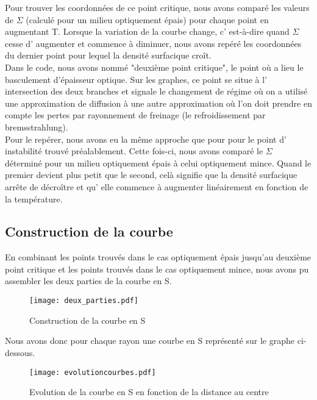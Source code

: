 Pour trouver les coordonnées de ce point critique, nous avons comparé les valeurs de $\Sigma$ (calculé pour un milieu optiquement épais) pour chaque point en augmentant T. Lorsque la variation de la courbe change, c' est-à-dire quand $\Sigma$ cesse d' augmenter et commence à diminuer, nous avons repéré les coordonnées du dernier point pour lequel la densité surfacique croît.  
\\
Dans le code, nous avons nommé "deuxième point critique", le point où a lieu le basculement d'épaisseur optique. Sur les graphes, ce point se situe à l' intersection des deux branches et signale le changement de régime où on a utilisé une approximation de diffusion à une autre approximation où l'on doit prendre en compte les pertes par rayonnement de freinage (le refroidissement par bremsstrahlung).
\\
Pour le repérer, nous avons eu la même approche que pour pour le point d' instabilité trouvé préalablement. Cette fois-ci, nous avons comparé le $\Sigma$ déterminé pour un milieu optiquement épais à celui optiquement mince. Quand le premier devient plus petit que le second, celà signifie que la densité surfacique arrête de décroître et qu' elle commence à augmenter linéairement en fonction de la température. 
\\

\subsection{Construction de la courbe}

En combinant les points trouvés dans le cas optiquement épais jusqu'au deuxième point critique et les points trouvés dans le cas optiquement mince, nous avons pu assembler les deux parties de la courbe en S.

\begin{figure}[htb!]
	\centering
	\texttt{[image: deux\_parties.pdf]}
	\caption{Construction de la courbe en S}
	\label{Fig::bench}
\end{figure}


Nous avons donc pour chaque rayon une courbe en S représenté sur le graphe ci-dessous.
\begin{figure}[htb!]
	\centering
	\texttt{[image: evolutioncourbes.pdf]}
	\caption{Evolution de la courbe en S en fonction de la distance au centre}
	\label{Fig::bench}
\end{figure}



